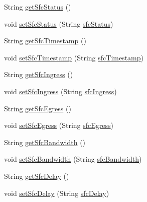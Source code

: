 \begin{DoxyCompactItemize}
\item 
String \mbox{\hyperlink{classcom_1_1example_1_1demo_1_1modular_1_1_sfc_ab4e1c16efd1df72a8675fdf213e1de0d}{get\+Sfc\+Status}} ()
\item 
void \mbox{\hyperlink{classcom_1_1example_1_1demo_1_1modular_1_1_sfc_acc04624185af498c5ba65491b0d9315d}{set\+Sfc\+Status}} (String \mbox{\hyperlink{classcom_1_1example_1_1demo_1_1modular_1_1_sfc_aef4582f35cc35919c5384cdee5c20c32}{sfc\+Status}})
\item 
String \mbox{\hyperlink{classcom_1_1example_1_1demo_1_1modular_1_1_sfc_a73aad56dab4a2292171ecd70d3afb941}{get\+Sfc\+Timestamp}} ()
\item 
void \mbox{\hyperlink{classcom_1_1example_1_1demo_1_1modular_1_1_sfc_a7ab73eeea053416d97d4112f0fbace9d}{set\+Sfc\+Timestamp}} (String \mbox{\hyperlink{classcom_1_1example_1_1demo_1_1modular_1_1_sfc_ad08b3121bf8fb27334db93307b052824}{sfc\+Timestamp}})
\item 
String \mbox{\hyperlink{classcom_1_1example_1_1demo_1_1modular_1_1_sfc_a1623de3951164b9b99e39bb5b1dff2d9}{get\+Sfc\+Ingress}} ()
\item 
void \mbox{\hyperlink{classcom_1_1example_1_1demo_1_1modular_1_1_sfc_a445b2674b7b7f5644f8284fe1154db41}{set\+Sfc\+Ingress}} (String \mbox{\hyperlink{classcom_1_1example_1_1demo_1_1modular_1_1_sfc_a56183d5e87ad5eefd0a6bc3a80244c86}{sfc\+Ingress}})
\item 
String \mbox{\hyperlink{classcom_1_1example_1_1demo_1_1modular_1_1_sfc_a332accfeb3ebbf9cbe7ccccc9458f7c0}{get\+Sfc\+Egress}} ()
\item 
void \mbox{\hyperlink{classcom_1_1example_1_1demo_1_1modular_1_1_sfc_a9af62e6f28c9f07e42d18d606bae686d}{set\+Sfc\+Egress}} (String \mbox{\hyperlink{classcom_1_1example_1_1demo_1_1modular_1_1_sfc_a399543ab700135a2ab190a508d898ea1}{sfc\+Egress}})
\item 
String \mbox{\hyperlink{classcom_1_1example_1_1demo_1_1modular_1_1_sfc_afc2970e8f887a6f23422a9827924440b}{get\+Sfc\+Bandwidth}} ()
\item 
void \mbox{\hyperlink{classcom_1_1example_1_1demo_1_1modular_1_1_sfc_af4c4f3cf8dd6f4ed28c5ca31fc21b277}{set\+Sfc\+Bandwidth}} (String \mbox{\hyperlink{classcom_1_1example_1_1demo_1_1modular_1_1_sfc_a57d1d7ebc46372af945f9ddbea5cc063}{sfc\+Bandwidth}})
\item 
String \mbox{\hyperlink{classcom_1_1example_1_1demo_1_1modular_1_1_sfc_ad9ce5a8d137a128f16879c795528a1f5}{get\+Sfc\+Delay}} ()
\item 
void \mbox{\hyperlink{classcom_1_1example_1_1demo_1_1modular_1_1_sfc_af8037157ff505d4ef1736b845903bc27}{set\+Sfc\+Delay}} (String \mbox{\hyperlink{classcom_1_1example_1_1demo_1_1modular_1_1_sfc_a7bfb3b587900390e0e9459a419fafabe}{sfc\+Delay}})

\end{DoxyCompactItemize}
